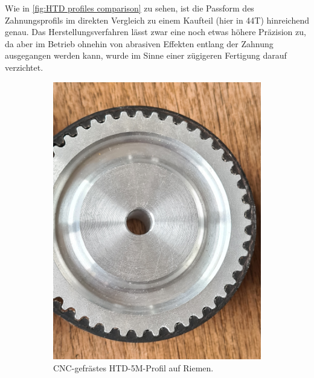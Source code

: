 		Wie in \cref{fig:HTD profiles comparison} zu sehen, ist die Passform des Zahnungsprofils im direkten Vergleich zu einem Kaufteil (hier in 44T) hinreichend genau.
		Das Herstellungsverfahren lässt zwar eine noch etwas höhere Präzision zu, da aber im Betrieb ohnehin von abrasiven Effekten entlang der Zahnung ausgegangen werden kann, wurde im Sinne einer zügigeren Fertigung darauf verzichtet.
		\begin{figure}[h]
			\centering
			\begin{subfigure}{.49\textwidth}
				\centering
				\includegraphics[width=\textwidth]{Footage/Pictures/Machined-HTD_tooth_fit.jpg}
				\caption{CNC-gefrästes HTD-5M-Profil auf Riemen.}%
				\label{subfig:machined HTD}
			\end{subfigure}
			\hfill
			\begin{subfigure}{.49\textwidth}
				\centering

\end{subfigure}
\end{figure}
